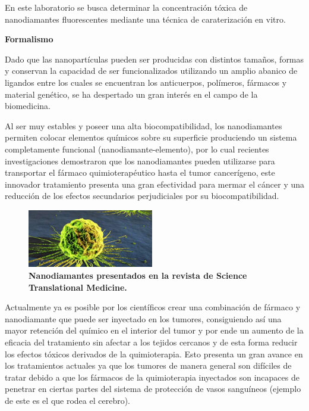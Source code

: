 En este laboratorio se busca  determinar la concentración tóxica de nanodiamantes fluorescentes mediante una técnica de caraterización en vitro.

\textbf{\textcolor{azul50}{Formalismo}}

Dado que las nanopartículas pueden ser producidas con distintos tamaños, formas y conservan la capacidad de ser funcionalizados utilizando un amplio abanico de ligandos entre
los cuales se encuentran los anticuerpos, polímeros,
fármacos y material genético, se ha despertado un gran interés en
el campo de la biomedicina. 

Al ser muy estables y poseer una alta
biocompatibilidad, los nanodiamantes permiten colocar elementos
químicos sobre su superficie produciendo un sistema
completamente funcional (nanodiamante-elemento), por lo cual recientes investigaciones demostraron que los nanodiamantes pueden utilizarse para transportar el fármaco quimioterapéutico hasta el tumor cancerígeno, este innovador tratamiento presenta una gran efectividad para mermar el cáncer y una reducción de los efectos secundarios perjudiciales por su biocompatibilidad.

\begin{figure}
    \includegraphics[width=0.49\textwidth]{Tarea5/nano.png}
    \caption{\textbf{Nanodiamantes presentados en la revista de Science Translational Medicine.}}
    \label{nano}
\end{figure}

Actualmente ya es posible por los científicos crear una combinación de fármaco y nanodiamante que puede ser inyectado en los tumores, consiguiendo así una mayor retención del químico en el interior del tumor y por ende un aumento de la eficacia del tratamiento sin afectar a los tejidos cercanos y de esta forma reducir los efectos tóxicos derivados de la quimioterapia. Esto presenta un gran avance en los tratamientos actuales ya que los tumores de manera general son difíciles de tratar debido a que los fármacos de la quimioterapia inyectados son incapaces de penetrar en ciertas partes del sistema de protección de vasos sanguíneos (ejemplo de este es el que rodea el cerebro). 



